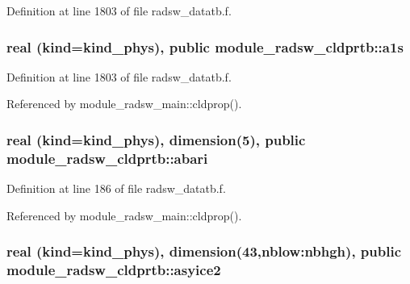 Definition at line 1803 of file radsw\+\_\+datatb.\+f.

\subsubsection[{\texorpdfstring{a1s}{a1s}}]{\setlength{\rightskip}{0pt plus 5cm}real (kind=kind\+\_\+phys), public module\+\_\+radsw\+\_\+cldprtb\+::a1s}\hypertarget{namespacemodule__radsw__cldprtb_a9bf8de06b96c5014ca7f21fd39d84257}{}\label{namespacemodule__radsw__cldprtb_a9bf8de06b96c5014ca7f21fd39d84257}


Definition at line 1803 of file radsw\+\_\+datatb.\+f.



Referenced by module\+\_\+radsw\+\_\+main\+::cldprop().

\subsubsection[{\texorpdfstring{abari}{abari}}]{\setlength{\rightskip}{0pt plus 5cm}real (kind=kind\+\_\+phys), dimension(5), public module\+\_\+radsw\+\_\+cldprtb\+::abari}\hypertarget{namespacemodule__radsw__cldprtb_ace960bbbf15ab3cadbee76301ff111dd}{}\label{namespacemodule__radsw__cldprtb_ace960bbbf15ab3cadbee76301ff111dd}


Definition at line 186 of file radsw\+\_\+datatb.\+f.



Referenced by module\+\_\+radsw\+\_\+main\+::cldprop().

\subsubsection[{\texorpdfstring{asyice2}{asyice2}}]{\setlength{\rightskip}{0pt plus 5cm}real (kind=kind\+\_\+phys), dimension(43,nblow\+:nbhgh), public module\+\_\+radsw\+\_\+cldprtb\+::asyice2}\hypertarget{namespacemodule__radsw__cldprtb_ad9328ffc5e90cc62c8c9c5089b55fc79}{}\label{namespacemodule__radsw__cldprtb_ad9328ffc5e90cc62c8c9c5089b55fc79}


